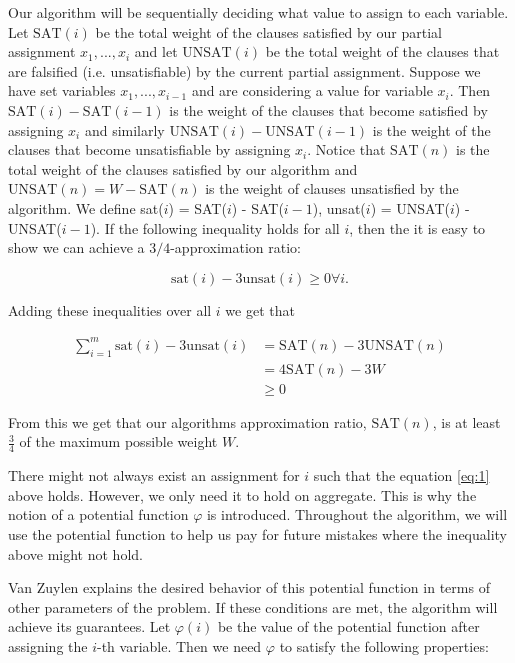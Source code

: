 \documentclass[11pt,letter]{article}
\numberwithin{theorem}{section}
\renewcommand{\phi}{\varphi}
\begin{document}
Our algorithm will be sequentially deciding what value to assign to each variable. Let $\mathrm{SAT}(i)$ be the total weight of the clauses
satisfied by our partial assignment $x_1, ..., x_i$ and let $\mathrm{UNSAT}(i)$ be the total weight of the clauses that are falsified (i.e. unsatisfiable) by the current partial assignment.
Suppose we have set variables $x_1,...,x_{i-1}$ and are considering a value for variable $x_i$. Then $\mathrm{SAT}(i)-\mathrm{SAT}(i-1)$ is the weight
of the clauses that become satisfied by assigning $x_i$ and similarly $\mathrm{UNSAT}(i) - \mathrm{UNSAT}(i-1)$ is the weight of the clauses that become
unsatisfiable by assigning $x_i$.
Notice that $\mathrm{SAT}(n)$ is the total weight of the clauses satisfied by our algorithm and $\mathrm{UNSAT}(n) = W - \mathrm{SAT}(n)$ is the weight of clauses
unsatisfied by the algorithm. We define sat($i$) = SAT($i$) - SAT($i-1$), unsat($i$) = UNSAT($i$) - UNSAT($i-1$). If the following inequality holds for all $i$, then the it is easy to show we can achieve a $3/4$-approximation ratio:

\begin{equation}
\label{eq:1}
\mathrm{sat}(i) - 3\mathrm{unsat}(i) \geq 0 \forall i.
\end{equation}

Adding these inequalities over all $i$ we get that

\begin{equation*}
\begin{aligned}
\sum_{i = 1}^{m} \mathrm{sat}(i) - 3\mathrm{unsat}(i) & = \mathrm{SAT}(n) - 3\mathrm{UNSAT}(n) \\
& = 4\mathrm{SAT}(n) - 3W \\
& \geq 0
\end{aligned}
\end{equation*}

From this we get that our algorithms approximation ratio, $\textrm{SAT}(n)$, is at least $\frac{3}{4}$ of the maximum possible weight $W$.

There might not always exist an assignment for $i$ such that the equation \ref{eq:1} above holds. However, we only need it to hold on aggregate.
This is why the notion of a potential function $\phi$ is introduced. Throughout the algorithm, we will use the potential function to help us pay
for future mistakes where the inequality above might not hold.

Van Zuylen explains the desired behavior of this potential function in terms of other parameters of the problem. If these conditions are met, the algorithm
will achieve its guarantees. Let $\phi(i)$ be the value of the potential function after assigning the $i$-th variable. Then we need $\phi$ to satisfy the following properties:
\end{document}
